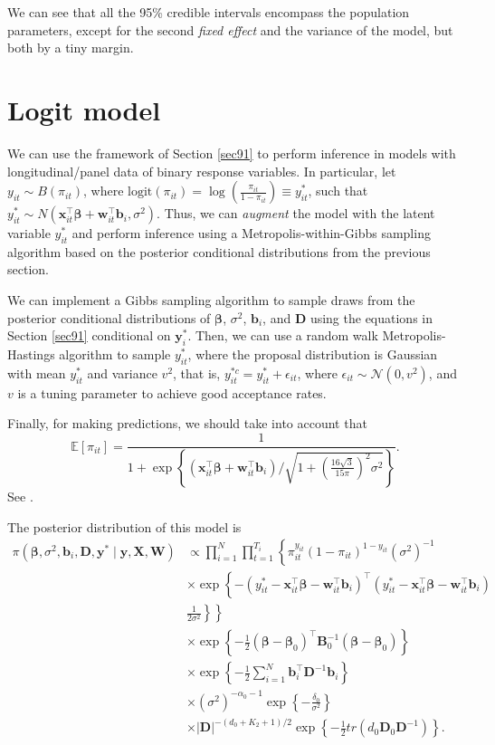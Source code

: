 We can see that all the 95\% credible intervals encompass the population parameters, except for the second \textit{fixed effect} and the variance of the model, but both by a tiny margin.  

\section{Logit model}\label{sec92}

We can use the framework of Section \ref{sec91} to perform inference in models with longitudinal/panel data of binary response variables. In particular, let $y_{it} \sim B(\pi_{it})$, where $\text{logit}(\pi_{it}) = \log\left(\frac{\pi_{it}}{1 - \pi_{it}}\right) \equiv y_{it}^*$, such that $y_{it}^* \sim N(\bm{x}_{it}^{\top} \bm{\beta} + \bm{w}_{it}^{\top} \bm{b}_i, \sigma^2)$. Thus, we can \textit{augment} the model with the latent variable $y_{it}^*$ and perform inference using a Metropolis-within-Gibbs sampling algorithm based on the posterior conditional distributions from the previous section. 

We can implement a Gibbs sampling algorithm to sample draws from the posterior conditional distributions of $\bm{\beta}$, $\sigma^2$, $\bm{b}_i$, and $\bm{D}$ using the equations in Section \ref{sec91} conditional on $\bm{y}_i^*$. Then, we can use a random walk Metropolis-Hastings algorithm to sample $y_{it}^*$, where the proposal distribution is Gaussian with mean $y_{it}^*$ and variance $v^2$, that is, $y_{it}^{*c} = y_{it}^* + \epsilon_{it}$, where $\epsilon_{it} \sim \mathcal{N}(0, v^2)$, and $v$ is a tuning parameter to achieve good acceptance rates. 

Finally, for making predictions, we should take into account that \[\mathbb{E}[\pi_{it}] = \frac{1}{1 + \exp\left\{(\bm{x}_{it}^{\top} \bm{\beta} + \bm{w}_{it}^{\top} \bm{b}_i)/\sqrt{1 + \left(\frac{16\sqrt{3}}{15\pi}\right)^2 \sigma^2}\right\}}.\] 
See \cite[~pag. 136]{diggle2002analysis}.

The posterior distribution of this model is
\begin{align*}
	\pi(\bm{\beta},\sigma^2, \bm{b}_i, \bm{D}, \bm{y}^*\mid \bm{y}, \bm{X}, \bm{W})&\propto \prod_{i=1}^N \prod_{t=1}^{T_i}\left\{\pi_{it}^{y_{it}}(1-\pi_{it})^{1-y_{it}} (\sigma^2)^{-1}\right.\\
	&\left.\times \exp\left\{-(y_{it}^*-\bm{x}_{it}^{\top}\bm{\beta}-\bm{w}_{it}^{\top}\bm{b}_i)^{\top}(y_{it}^*-\bm{x}_{it}^{\top}\bm{\beta}-\bm{w}_{it}^{\top}\bm{b}_i)\right.\right.\\
	&\left.\left.\frac{1}{2\sigma^2}\right\}\right\}\\
	&\times \exp\left\{-\frac{1}{2}(\bm{\beta}-\bm{\beta}_0)^{\top}\bm{B}_0^{-1}(\bm{\beta}-\bm{\beta}_0)\right\}\\
	&\times \exp\left\{-\frac{1}{2}\sum_{i=1}^N \bm{b}_i^{\top}\bm{D}^{-1}\bm{b}_i\right\}\\
	&\times (\sigma^2)^{-\alpha_0-1}\exp\left\{-\frac{\delta_0}{\sigma^2}\right\}\\
	&\times |\bm{D}|^{-(d_0+K_2+1)/2}\exp\left\{-\frac{1}{2}tr(d_0\bm{D}_0\bm{D}^{-1})\right\}.	
\end{align*}

